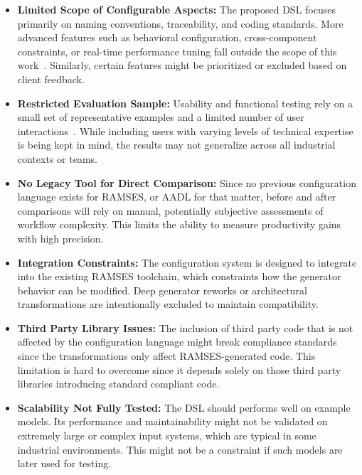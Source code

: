 \begin{itemize}
	\item \textbf{Limited Scope of Configurable Aspects:} The proposed DSL focuses primarily on naming conventions, traceability, and coding standards. More advanced features such as behavioral configuration, cross-component constraints, or real-time performance tuning fall outside the scope of this work~\cite{software_product_lines_practices_and_patterns_2015}. Similarly, certain features might be prioritized or excluded based on client feedback.
	
	\item \textbf{Restricted Evaluation Sample:} Usability and functional testing rely on a small set of representative examples and a limited number of user interactions~\cite{Bias_Mayhew_1994}. While including users with varying levels of technical expertise is being kept in mind, the results may not generalize across all industrial contexts or teams.
	
	\item \textbf{No Legacy Tool for Direct Comparison:} Since no previous configuration language exists for \gls{RAMSES}, or \gls{AADL} for that matter, before and after comparisons will rely on manual, potentially subjective assessments of workflow complexity. This limits the ability to measure productivity gains with high precision.
	
	\item \textbf{Integration Constraints:} The configuration system is designed to integrate into the existing \gls{RAMSES} toolchain, which constraints how the generator behavior can be modified. Deep generator reworks or architectural transformations are intentionally excluded to maintain compatibility.
	
	\item \textbf{Third Party Library Issues:} The inclusion of third party code that is not affected by the configuration language might break compliance standards since the transformations only affect \gls{RAMSES}-generated code. This limitation is hard to overcome since it depends solely on those third party libraries introducing standard compliant code.
	
	\item \textbf{Scalability Not Fully Tested:} The \gls{DSL} should performs well on example models. Its performance and maintainability might not be validated on extremely large or complex input systems, which are typical in some industrial environments. This might not be a constraint if such models are later used for testing.
	
\end{itemize}

